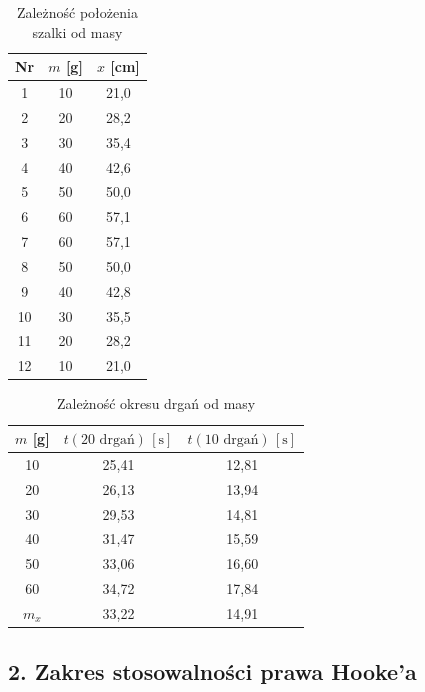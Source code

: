 \documentclass[a4paper,12pt]{article}
\begin{document}
\begin{table}[H]
    \centering
    \begin{tabular}{|c|c|c|}
        \hline
        Nr & $m$ [g] & $x$ [cm] \\
        \hline
        1  & 10  & 21,0 \\
        2  & 20  & 28,2 \\
        3  & 30  & 35,4 \\
        4  & 40  & 42,6 \\
        5  & 50  & 50,0 \\
        6  & 60  & 57,1 \\
        \hline
        7  & 60  & 57,1 \\
        8  & 50  & 50,0 \\
        9  & 40  & 42,8 \\
        10 & 30  & 35,5 \\
        11 & 20  & 28,2 \\
        12 & 10  & 21,0 \\
        \hline
    \end{tabular}
    \caption{Zależność położenia szalki od masy}
\end{table}

\begin{table}[H]
    \centering
    \begin{tabular}{|c|c|c|}
        \hline
        $m$ [g] & $t(20 \text{ drgań})\,[\text{s}]$ & $t(10 \text{ drgań})\,[\text{s}]$ \\
        \hline
        10 & 25,41 & 12,81 \\
        20 & 26,13 & 13,94 \\
        30 & 29,53 & 14,81 \\
        40 & 31,47 & 15,59 \\
        50 & 33,06 & 16,60 \\
        60 & 34,72 & 17,84 \\
        $m_x$ & 33,22 & 14,91 \\
        \hline
    \end{tabular}
    \caption{Zależność okresu drgań od masy}
\end{table}



\subsection{2.  Zakres stosowalności prawa Hooke'a}
\end{document}
